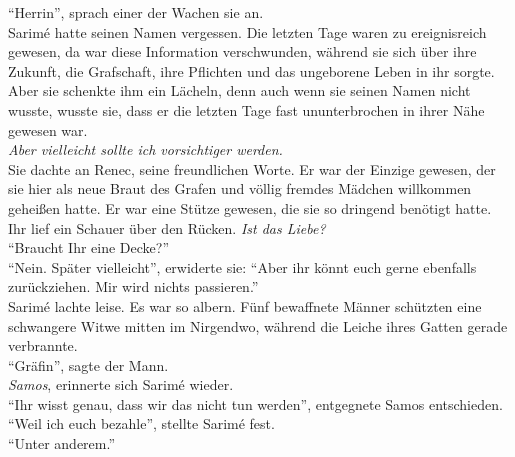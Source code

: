 ``Herrin'', sprach einer der Wachen sie an.\\
Sarimé hatte seinen Namen vergessen. Die letzten Tage waren zu ereignisreich gewesen, da war diese 
Information verschwunden, während sie sich über ihre Zukunft, die Grafschaft, ihre Pflichten und 
das ungeborene Leben in ihr sorgte. Aber sie schenkte ihm ein Lächeln, denn auch wenn sie seinen 
Namen nicht wusste, wusste sie, dass er die letzten Tage fast ununterbrochen in ihrer Nähe gewesen 
war. \\
\textit{ Aber vielleicht sollte ich vorsichtiger werden.}\\
Sie dachte an Renec, seine freundlichen Worte. Er war der Einzige gewesen, der sie hier als neue 
Braut des Grafen und völlig fremdes Mädchen willkommen geheißen hatte. Er war eine Stütze gewesen, 
die sie so dringend benötigt hatte. Ihr lief ein Schauer über den Rücken. \textit{Ist das Liebe?}\\
``Braucht Ihr eine Decke?''\\
``Nein. Später vielleicht'', erwiderte sie: ``Aber ihr könnt euch gerne ebenfalls zurückziehen. Mir 
wird nichts passieren.'' \\ 
Sarimé lachte leise. Es war so albern. Fünf bewaffnete Männer schützten eine schwangere Witwe 
mitten im Nirgendwo, während die Leiche ihres Gatten gerade verbrannte.\\
``Gräfin'', sagte der Mann.\\
\textit{Samos}, erinnerte sich Sarimé wieder.\\
``Ihr wisst genau, dass wir das nicht tun werden'', entgegnete Samos entschieden.\\
``Weil ich euch bezahle'', stellte Sarimé fest.\\
``Unter anderem.''\\


